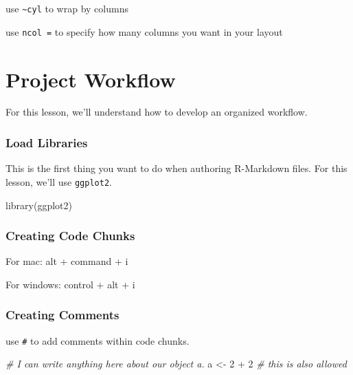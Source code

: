 \documentclass[
]{book}
\newenvironment{Shaded}{\begin{snugshade}}{\end{snugshade}}
\newcommand{\CommentTok}[1]{\textcolor[rgb]{0.56,0.35,0.01}{\textit{#1}}}
\newcommand{\DecValTok}[1]{\textcolor[rgb]{0.00,0.00,0.81}{#1}}
\newcommand{\FunctionTok}[1]{\textcolor[rgb]{0.00,0.00,0.00}{#1}}
\newcommand{\NormalTok}[1]{#1}
\newcommand{\OtherTok}[1]{\textcolor[rgb]{0.56,0.35,0.01}{#1}}
\newcommand{\SpecialCharTok}[1]{\textcolor[rgb]{0.00,0.00,0.00}{#1}}
\begin{document}
use \texttt{\textasciitilde{}cyl} to wrap by columns

use \texttt{ncol\ =} to specify how many columns you want in your layout

\hypertarget{project-workflow}{%
\chapter{Project Workflow}\label{project-workflow}}

For this lesson, we'll understand how to develop an organized workflow.

\hypertarget{load-libraries}{%
\subsection{Load Libraries}\label{load-libraries}}

This is the first thing you want to do when authoring R-Markdown files. For this lesson, we'll use \texttt{ggplot2}.

\begin{Shaded}
\begin{Highlighting}[]
\FunctionTok{library}\NormalTok{(ggplot2)}
\end{Highlighting}
\end{Shaded}

\hypertarget{creating-code-chunks}{%
\subsection{Creating Code Chunks}\label{creating-code-chunks}}

For mac: alt + command + i

For windows: control + alt + i

\hypertarget{creating-comments}{%
\subsection{Creating Comments}\label{creating-comments}}

use \texttt{\#} to add comments within code chunks.

\begin{Shaded}
\begin{Highlighting}[]
\CommentTok{\# I can write anything here about our object a.}
\NormalTok{a }\OtherTok{\textless{}{-}} \DecValTok{2} \SpecialCharTok{+} \DecValTok{2} \CommentTok{\# this is also allowed}
\end{Highlighting}
\end{Shaded}
\end{document}
